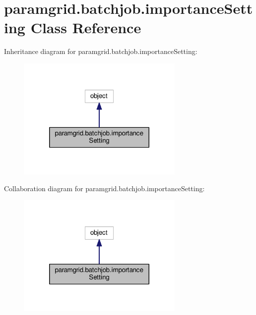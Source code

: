 \hypertarget{classparamgrid_1_1batchjob_1_1importanceSetting}{}\section{paramgrid.\+batchjob.\+importance\+Setting Class Reference}
\label{classparamgrid_1_1batchjob_1_1importanceSetting}


Inheritance diagram for paramgrid.\+batchjob.\+importance\+Setting\+:
\nopagebreak
\begin{figure}[H]
\begin{center}
\leavevmode
\includegraphics[width=228pt]{classparamgrid_1_1batchjob_1_1importanceSetting__inherit__graph}
\end{center}
\end{figure}


Collaboration diagram for paramgrid.\+batchjob.\+importance\+Setting\+:
\nopagebreak
\begin{figure}[H]
\begin{center}
\leavevmode
\includegraphics[width=228pt]{classparamgrid_1_1batchjob_1_1importanceSetting__coll__graph}
\end{center}
\end{figure}
